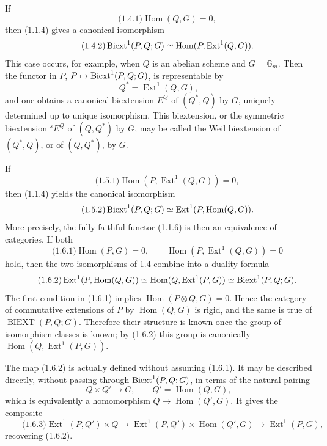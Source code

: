 \documentclass[11pt]{article}
\providecommand{\Gm}{\mathbb G_m}
\providecommand{\Hom}{\operatorname{Hom}}
\providecommand{\Ext}{\operatorname{Ext}}
\begin{document}
If
\begin{equation}\qquad\text{(1.4.1)}
        \Hom(Q,G)=0,
\end{equation}
then (1.1.4) gives a canonical isomorphism
\begin{equation}\qquad\text{(1.4.2)}
        \Biext^1(P,Q;G)\simeq\Hom(P,\Ext^1(Q,G)).
\end{equation}
This case occurs, for example, when \(Q\) is an abelian scheme and \(G=\Gm\).  Then the functor in \(P\), \(P\mapsto\operatorname{Biext}^1(P,Q;G)\), is representable by
\[
        Q^*=\Ext^1(Q,G),
\]
and one obtains a canonical biextension \(E^Q\) of \((Q^*,Q)\) by \(G\), uniquely determined up to unique isomorphism.  This biextension, or the symmetric biextension \({}^sE^Q\) of \((Q,Q^*)\) by \(G\), may be called the Weil biextension of \((Q^*,Q)\), or of \((Q,Q^*)\), by \(G\).

If
\begin{equation}\qquad\text{(1.5.1)}
        \Hom(P,\Ext^1(Q,G))=0,
\end{equation}
then (1.1.4) yields the canonical isomorphism
\begin{equation}\qquad\text{(1.5.2)}
        \Biext^1(P,Q;G)\simeq \Ext^1(P,\Hom(Q,G)).
\end{equation}
More precisely, the fully faithful functor (1.1.6) is then an equivalence of categories.  If both
\begin{equation}\qquad\text{(1.6.1)}
        \Hom(P,G)=0,
        \qquad
        \Hom(P,\Ext^1(Q,G))=0
\end{equation}
hold, then the two isomorphisms of 1.4 combine into a duality formula
\begin{equation}\qquad\text{(1.6.2)}
        \Ext^1(P,\Hom(Q,G))
        \simeq \Hom(Q,\Ext^1(P,G))
        \simeq \Biext^1(P,Q;G).
\end{equation}
The first condition in (1.6.1) implies \(\Hom(P\otimes Q,G)=0\).  Hence the category of commutative extensions of \(P\) by \(\Hom(Q,G)\) is rigid, and the same is true of \(\operatorname{BIEXT}(P,Q;G)\).  Therefore their structure is known once the group of isomorphism classes is known; by (1.6.2) this group is canonically \(\Hom(Q,\Ext^1(P,G))\).

The map (1.6.2) is actually defined without assuming (1.6.1).  It may be described directly, without passing through \(\operatorname{Biext}^1(P,Q;G)\), in terms of the natural pairing
\[
        Q\times Q'\longrightarrow G,
        \qquad Q'=\Hom(Q,G),
\]
which is equivalently a homomorphism \(Q\to\Hom(Q',G)\).  It gives the composite
\begin{equation}\qquad\text{(1.6.3)}
        \Ext^1(P,Q')\times Q
        \longrightarrow \Ext^1(P,Q')\times\Hom(Q',G)
        \longrightarrow \Ext^1(P,G),
\end{equation}
recovering (1.6.2).
\end{document}
